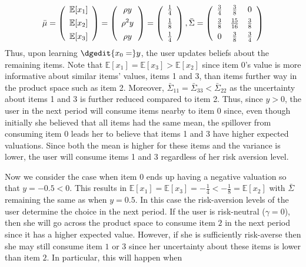 \documentclass[manuscript]{acmart}
\begin{document}
\[ \bar{\mu} =   \left (\begin{array}{c}
\mathbb{E}[x_1] \vspace{0.15cm} \\
\mathbb{E}[x_2] \vspace{0.15cm} \\
\mathbb{E}[x_3]
\end{array}  \right) =\left (\begin{array}{c}
\rho y  \vspace{0.15cm} \\
\rho^{2} y  \vspace{0.15cm} \\
 \rho y \\
\end{array} \right) =
\left (\begin{array}{c}
\frac{1}{4} \vspace{0.15cm} \\
\frac{1}{8}  \vspace{0.15cm} \\
\frac{1}{4}
\end{array}  \right), \bar{\Sigma} =  \left( \begin{array}{ccc}
\frac{3}{4} & \frac{3}{8} & 0 \vspace{0.15cm} \\
\frac{3}{8} & \frac{15}{16} & \frac{3}{8} \vspace{0.15cm}  \\
0 &\frac{3}{8} & \frac{3}{4}  \\
\end{array} \right)
\]
Thus, upon learning $\dgedit{x_0=}y$, the user updates beliefs about the remaining items. Note that $\mathbb{E}[x_1] = \mathbb{E}[x_3] > \mathbb{E}[x_2]$ since item 0's value is more informative about similar items' values, items 1 and 3, than items further way in the product space such as item 2. Moreover, $\bar{\Sigma}_{11} = \bar{\Sigma}_{33} < \bar{\Sigma}_{22}$ as the uncertainty about items 1 and 3 is further reduced compared to item 2. Thus, since $y > 0$, the user in the next period will consume items nearby to item 0 since, even though initially she believed that all items had the same mean, the spillover from consuming item 0 leads her to believe that items 1 and 3 have higher expected valuations. Since both the mean is higher for these items and the variance is lower, the user will consume items 1 and 3 regardless of her risk aversion level.
\par 
Now we consider the case when item 0 ends up having a negative valuation so that $y = -0.5 < 0$. This results in $\mathbb{E}[x_1] = \mathbb{E}[x_3] = -\frac{1}{4} <  -\frac{1}{8} = \mathbb{E}[x_2]$ with $\bar{\Sigma}$ remaining the same as when $y = 0.5$. In this case the risk-aversion levels of the user determine the choice in the next period. If the user is risk-neutral ($\gamma = 0$), then she will go across the product space to consume item $2$ in the next period since it has a higher expected value. However, if she is sufficiently risk-averse then she may still consume item $1$ or $3$ since her uncertainty about these items is lower than item $2$. In particular, this will happen when 
\end{document}
